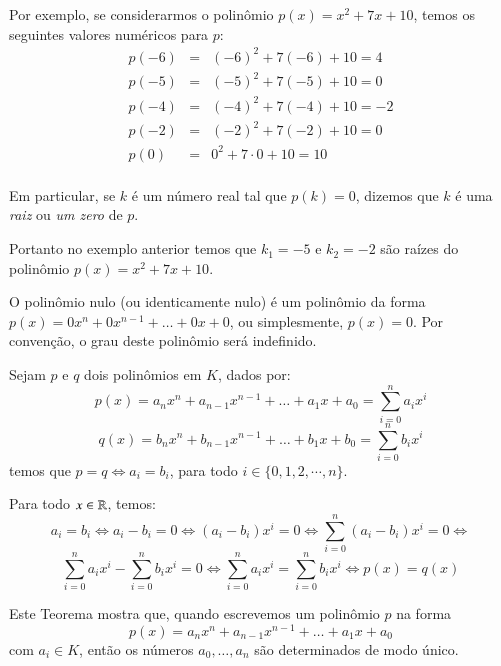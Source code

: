 \begin{exem}
Por exemplo, se considerarmos o polinômio $p(x)= x^2 + 7x+10$, temos os seguintes valores numéricos para $p$:
\begin{eqnarray*}
p(-6)&=& (-6)^2 + 7(-6) +10= 4\\
p(-5)&=& (-5)^2 + 7(-5) +10= 0\\
p(-4)&=& (-4)^2 + 7(-4) +10= -2\\
p(-2)&=& (-2)^2 + 7(-2) +10= 0\\
p(0)&=& 0^2 + 7 \cdot 0 +10= 10\\
\end{eqnarray*}
\end{exem}

 \begin{defi}
 Em particular, se $k$ é um número real tal que $p(k)= 0$, dizemos que $k$ é uma \emph{raiz} ou \emph{um zero} de $p$.
 \end{defi}

 \begin{exem}
 Portanto no exemplo anterior temos que $k_1= -5$ e $k_2=-2$ são raízes do polinômio $p(x)= x^2 + 7x+10$.
 \end{exem}

  \begin{defi}
  O polinômio nulo (ou identicamente nulo) é um polinômio da forma $p(x)= 0x^n +0x^{n-1}+ \ldots + 0x+ 0$, ou simplesmente, $p(x)= 0$. Por convenção, o grau deste polinômio será indefinido.
 \end{defi}


  \begin{teo}
  Sejam $p$ e $q$ dois polinômios em $K$, dados por:
  \[p(x)= a_nx^n + a_{n-1}x^{n-1}+ \ldots + a_1x+ a_0= \sum_{i=0}^{n} a_ix^i\]
  \[q(x)= b_nx^n + b_{n-1}x^{n-1}+ \ldots + b_1x+ b_0= \sum_{i=0}^{n} b_ix^i\]
  temos que $p=q \Leftrightarrow a_i= b_i$, para todo $i \in \{0, 1, 2, \cdots, n\}$.
 \end{teo}

 \begin{dem}
 Para todo $x \in \mathbb{R}$, temos:
 \[a_i= b_i \Leftrightarrow a_i - b_i=0 \Leftrightarrow (a_i - b_i)x^i=0 \Leftrightarrow \sum_{i=0}^{n}(a_i - b_i)x^i= 0 \Leftrightarrow\]
 \[ \sum_{i=0}^{n}a_i x^i - \sum_{i=0}^{n}b_i x^i = 0 \Leftrightarrow \sum_{i=0}^{n}a_i x^i = \sum_{i=0}^{n}b_i x^i \Leftrightarrow p(x)= q(x)\]

 \end{dem}

  Este Teorema mostra que, quando escrevemos um polinômio $p$ na forma
 \[p(x)= a_nx^n + a_{n-1}x^{n-1}+ \ldots + a_1x+ a_0\]
 com $a_i \in K$, então os números $a_0, \ldots, a_n$ são determinados de modo único.

